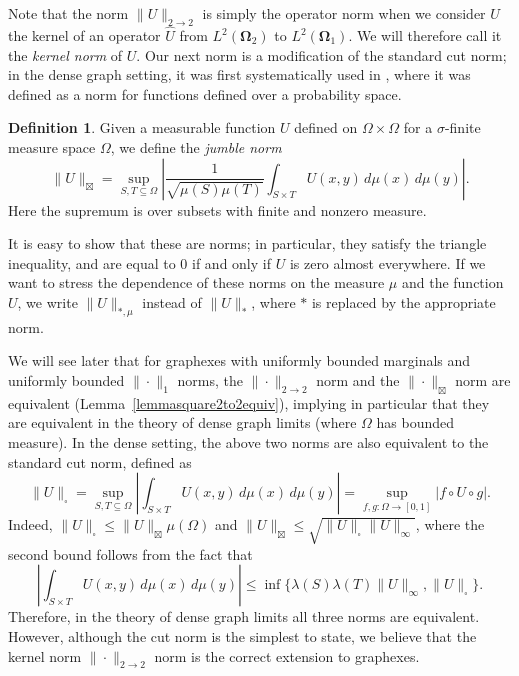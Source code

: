 \documentclass{amsart}
\numberwithin{equation}{section}
\numberwithin{figure}{section}
\theoremstyle{definition}
\newtheorem{definition}[theorem]{Definition}
\theoremstyle{remark}
\newcommand{\jbl}{{\boxtimes}}
\newcommand{\bOmega}{{\mathbf{\Omega}}}
\begin{document}
Note that the norm $\|U\|_{2 \rightarrow 2} $ is simply the operator norm
when we consider $U$ the kernel of an operator $\widehat U$ from
$L^2(\bOmega_2)$ to $L^2(\bOmega_1)$. We will therefore call it the
\emph{kernel norm} of $U$. Our next norm is a modification of the standard
cut norm; in the dense graph setting, it was first systematically used in
\cite{KLS14}, where it was defined as a norm for functions defined over a
probability space.

\begin{definition}\label{def:jumble-norm}
Given a measurable function $U$ defined on $\Omega \times \Omega$ for a
$\sigma$-finite measure space $\Omega$, we define the \emph{jumble norm}
\[\|U\|_{\jbl}=\sup_{S,T \subseteq \Omega} \left| \frac{1}{\sqrt{\mu(S)\mu(T)}}\int_{S \times T} U(x,y) \,d\mu(x)
\,d\mu(y)
\right|.\] Here the supremum is over subsets with finite and nonzero measure.
\end{definition}

It is easy to show that these are norms; in particular, they satisfy the
triangle inequality, and are equal to $0$ if and only if $U$ is zero almost
everywhere. If we want to stress the dependence of these norms on the measure
$\mu$ and the function $U$, we write $\|U\|_{*,\mu}$ instead of $\|U\|_*$,
where $*$ is replaced by the appropriate norm.

We will see later that for graphexes with uniformly bounded marginals and
uniformly bounded $\|\cdot\|_1$ norms, the $\|\cdot\|_{2 \rightarrow 2}$ norm
and the $\|\cdot\|_{\jbl}$ norm are equivalent
(Lemma~\ref{lemmasquare2to2equiv}), implying in particular that they are
equivalent in the theory of dense graph limits (where $\Omega$ has bounded
measure). In the dense setting, the above two norms are also equivalent to
the standard cut norm, defined as
\[
\|U\|_{\square}=\sup_{S,T \subseteq \Omega} \left|\int_{S \times T} U(x,y)\,d\mu(x) \,d\mu(y) \right|
=
\sup_{f,g\colon \Omega\to [0,1]}| f \circ U \circ g|.
\]
Indeed, $\|U\|_\square \le \|U\|_{\jbl} \mu(\Omega)$ and $\|U\|_{\jbl} \le
\sqrt{\|U\|_\square\|U\|_\infty}$, where the second bound follows from the
fact that
\[
\left|\int_{S \times T} U(x,y) \,d\mu(x) \,d\mu(y)
\right|\leq \inf\{\lambda(S)\lambda(T)\|U\|_\infty,\|U\|_\square\}.
\]
Therefore, in the theory of dense graph limits all three norms are
equivalent. However, although the cut norm is the simplest to state, we
believe that the kernel norm $\|\cdot\|_{2 \rightarrow 2}$ norm is the
correct extension to graphexes.
\end{document}
